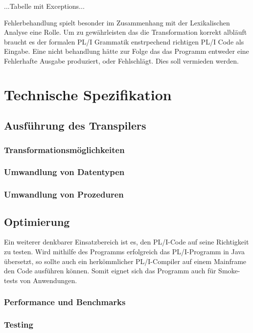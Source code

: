...Tabelle mit Exceptions...

Fehlerbehandlung spielt besonder im Zusammenhang mit der Lexikalischen Analyse eine Rolle. Um zu gewährleisten das die Transformation korrekt albläuft braucht es der formalen PL/I Grammatik enstrpechend richtigen PL/I Code als Eingabe. Eine nicht behandlung hätte zur Folge das das Programm entweder eine Fehlerhafte Ausgabe produziert, oder Fehlschlägt. Dies soll vermieden werden.

\section{Technische Spezifikation}
	\subsection{Ausführung des Transpilers}
		\subsubsection{Transformationsmöglichkeiten}
		\subsubsection{Umwandlung von Datentypen}
		\subsubsection{Umwandlung von Prozeduren}
	\subsection{Optimierung}
	Ein weiterer denkbarer Einsatzbereich ist es, den PL/I-Code auf seine Richtigkeit zu testen. Wird mithilfe des Programms erfolgreich das PL/I-Programm in Java übersetzt, so sollte auch ein herkömmlicher PL/I-Compiler auf einem Mainframe den Code ausführen können. Somit eignet sich das Programm auch für Smoke-tests von Anwendungen.
		\subsubsection{Performance und Benchmarks}
		\subsubsection{Testing}
